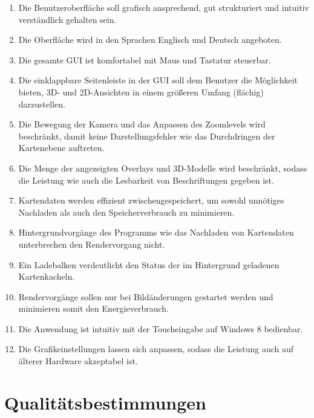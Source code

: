 \documentclass[10pt]{scrreprt}
\begin{document}
\begin{enumerate}[leftmargin=2cm]
\item Die Benutzeroberfläche soll grafisch ansprechend, gut strukturiert und intuitiv verständlich gehalten sein.
\item Die Oberfläche wird in den Sprachen Englisch und Deutsch angeboten.
\item Die gesamte GUI ist komfortabel mit Maus und Tastatur steuerbar.
\item Die einklappbare Seitenleiste in der GUI soll dem Benutzer die Möglichkeit bieten, 3D- und 2D-Ansichten in einem größeren Umfang (flächig) darzustellen.
\item Die Bewegung der Kamera und das Anpassen des Zoomlevels wird beschränkt, damit keine Darstellungsfehler wie das Durchdringen der Kartenebene auftreten.
\item Die Menge der angezeigten Overlays und 3D-Modelle wird beschränkt, sodass die Leistung wie auch die Lesbarkeit von Beschriftungen gegeben ist.

\item Kartendaten werden effizient zwischengespeichert, um sowohl unnötiges Nachladen als auch den Speicherverbrauch zu minimieren.
\item Hintergrundvorgänge des Programms wie das Nachladen von Kartendaten unterbrechen den Rendervorgang nicht.
\item Ein Ladebalken verdeutlicht den Status der im Hintergrund geladenen Kartenkacheln.
\item \W Rendervorgänge sollen nur bei Bildänderungen gestartet werden und minimieren somit den Energieverbrauch.



\item \W Die Anwendung ist intuitiv mit der Toucheingabe auf Windows 8 bedienbar.
\item \W Die Grafikeinstellungen lassen sich anpassen, sodass die Leistung auch auf älterer Hardware akzeptabel ist.


\end{enumerate}



\chapter{Qualitätsbestimmungen}
\end{document}
